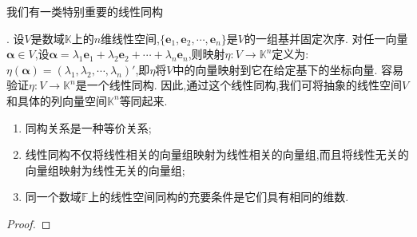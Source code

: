 \documentclass[lang=cn,newtx,10pt,scheme=chinese]{elegantbook}
\begin{document}
\hypertarget{线性同构1}{我们有一类特别重要的线性同构}. 设\(V\)是数域\(\mathbb{K}\)上的\(n\)维线性空间,\(\{\boldsymbol{e}_1,\boldsymbol{e}_2,\cdots,\boldsymbol{e}_n\}\)是\(V\)的一组基并固定次序. 对任一向量\(\boldsymbol{\alpha}\in V\),设\(\boldsymbol{\alpha}=\lambda_1\boldsymbol{e}_1+\lambda_2\boldsymbol{e}_2+\cdots+\lambda_n\boldsymbol{e}_n\),则映射\(\eta:V\to\mathbb{K}^n\)定义为:\(\eta(\boldsymbol{\alpha})=(\lambda_1,\lambda_2,\cdots,\lambda_n)'\),即\(\eta\)将\(V\)中的向量映射到它在给定基下的坐标向量. 容易验证\(\eta:V\to\mathbb{K}^n\)是一个线性同构. 因此,通过这个线性同构,我们可将抽象的线性空间\(V\)和具体的列向量空间\(\mathbb{K}^n\)等同起来.

\begin{theorem}\label{theorem:线性空间的同构}
\begin{enumerate}[(1)]
\item 同构关系是一种等价关系;
\item 线性同构不仅将线性相关的向量组映射为线性相关的向量组,而且将线性无关的向量组映射为线性无关的向量组;
\item 同一个数域\(\mathbb{F}\)上的线性空间同构的充要条件是它们具有相同的维数.
\end{enumerate}
\end{theorem}
\begin{proof}

\end{proof}
\end{document}
